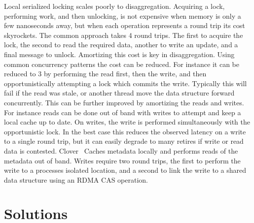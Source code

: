 Local serialized locking scales poorly to disaggregation. Acquiring a lock,
performing work, and then unlocking, is not expensive when memory is only a few
nanoseconds away, but when each operation represents a round trip its cost
skyrockets. The common approach takes 4 round trips. The first to acquire the
lock, the second to read the required data, another to write an update, and a
final message to unlock. Amortizing this cost is key in disaggregation. Using
common concurrency patterns the cost can be reduced. For instance it can be
reduced to 3 by performing the read first, then the write, and then
opportunistically attempting a lock which commits the write. Typically this will
fail if the read was stale, or another thread move the data structure forward
concurrently. This can be further improved by amortizing the reads and writes.
For instance reads can be done out of band with writes to attempt and keep a
local cache up to date. On writes, the write is performed simultaneously with
the opportunistic lock. In the best case this reduces the observed latency on a
write to a single round trip, but it can easily degrade to many retires if write
or read data is contested. Clover~\cite{clover} Caches metadata locally and
performs reads of the metadata out of band. Writes require two round trips, the
first to perform the write to a processes isolated location, and a second to
link the write to a shared data structure using an RDMA CAS operation.





\section{Solutions}

